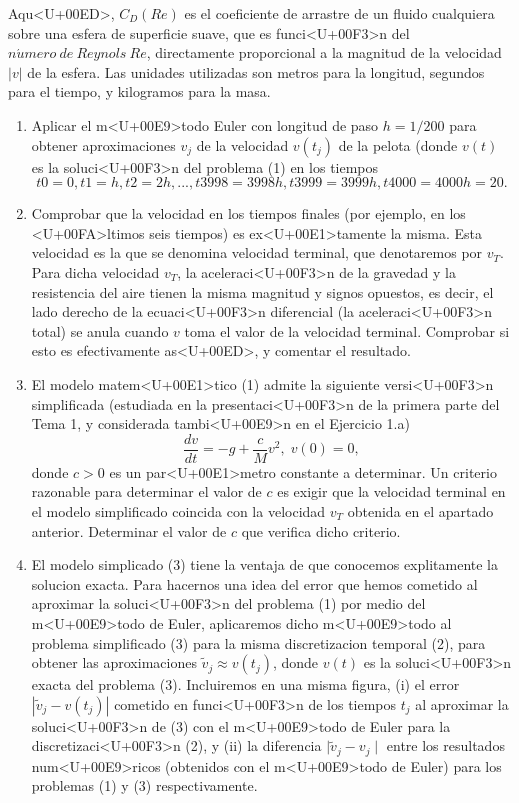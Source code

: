 \documentclass[12pt,a4paper]{article}
\begin{document}
Aqu<U+00ED>, $C_{D}(Re)$ es el coeficiente de arrastre de un fluido cualquiera sobre una esfera de superficie suave, que es funci<U+00F3>n del $n\acute{u}mero\:de\:Reynols\:Re$, directamente proporcional a la magnitud de la velocidad $|v|$ de la esfera. Las unidades utilizadas son metros para la longitud, segundos para el tiempo, y kilogramos para la masa.
\begin{enumerate}
\item 
Aplicar el m<U+00E9>todo Euler con longitud de paso $h = 1/200$ para obtener aproximaciones $v_j$ de la velocidad $v(t_j)$ de la pelota (donde $v(t)$ es la soluci<U+00F3>n del problema (1) en los tiempos
\begin{equation}
t0 = 0, t1 = h, t2 = 2h,...,t3998 = 3998h, t3999 = 3999h, t4000 = 4000h = 20. 
\end{equation}

\item
Comprobar que la velocidad en los tiempos finales (por ejemplo, en los <U+00FA>ltimos seis tiempos) es ex<U+00E1>tamente la misma. Esta velocidad es la que se denomina velocidad terminal, que denotaremos por $v_T$. Para dicha velocidad $v_T$, la aceleraci<U+00F3>n de la gravedad y la resistencia del aire tienen la misma magnitud y signos opuestos, es decir, el lado derecho de la ecuaci<U+00F3>n diferencial (la aceleraci<U+00F3>n total) se anula cuando $v$ toma el valor de la velocidad terminal. Comprobar si esto es efectivamente as<U+00ED>, y comentar el resultado.

\item
El modelo matem<U+00E1>tico (1) admite la siguiente versi<U+00F3>n simplificada (estudiada en la presentaci<U+00F3>n de la primera parte del Tema 1, y considerada tambi<U+00E9>n en el Ejercicio 1.a)
\begin{equation}
\frac{dv}{dt} = -g+\frac{c}{M}v^{2},\; v(0) = 0,
\end{equation}
donde $c > 0$ es un par<U+00E1>metro constante a determinar. Un criterio razonable para determinar el valor de $c$ es exigir que la velocidad terminal en el modelo simplificado coincida con la velocidad $v_T$ obtenida en el apartado anterior. Determinar el valor de $c$ que verifica dicho criterio.

\item
El modelo simplicado (3) tiene la ventaja de que conocemos explitamente la solucion exacta. Para hacernos una idea del error que hemos cometido al aproximar la soluci<U+00F3>n del problema (1) por medio del m<U+00E9>todo de Euler, aplicaremos dicho m<U+00E9>todo al problema simplificado (3) para la misma discretizacion temporal (2), para obtener las aproximaciones $\tilde{v}_j \approx v(t_j)$, donde $v(t)$ es la soluci<U+00F3>n exacta del problema (3). Incluiremos en una misma figura, (i) el error $|\tilde{v}_j - v(t_j)|$ cometido en funci<U+00F3>n de los tiempos $t_j$ al aproximar la soluci<U+00F3>n de (3) con el m<U+00E9>todo de Euler para la discretizaci<U+00F3>n (2), y (ii) la diferencia $\mid\tilde{v}_j - v_j\mid$ entre los resultados num<U+00E9>ricos (obtenidos con el m<U+00E9>todo de Euler) para los problemas (1) y (3) respectivamente.


\end{enumerate}
\end{document}
